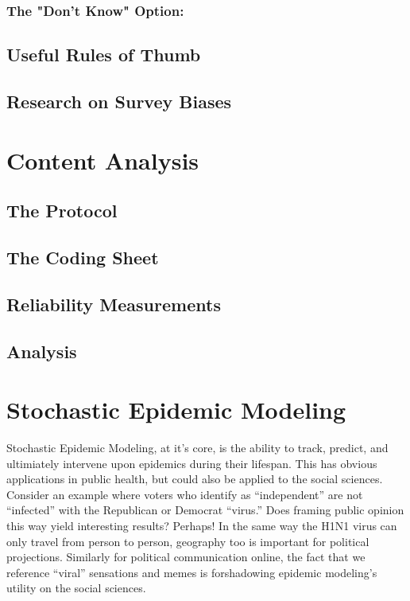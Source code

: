 \documentclass[12pt]{article}\usepackage[]{graphicx}\usepackage[]{color}
\begin{document}
\begin{flushleft}
\subsubsection{The "Don't Know" Option:}



\subsection{Useful Rules of Thumb}

\subsection{Research on Survey Biases}


\clearpage



\clearpage
\section{Content Analysis}

\subsection{The Protocol}

\subsection{The Coding Sheet}

\subsection{Reliability Measurements}

\subsection{Analysis}




\clearpage
\section{Stochastic Epidemic Modeling}

Stochastic Epidemic Modeling, at it's core, is the ability to track, predict, and ultimiately intervene upon epidemics during their lifespan. This has obvious applications in public health, but could also be applied to the social sciences. Consider an example where voters who identify as ``independent'' are not ``infected'' with the Republican or Democrat ``virus.'' Does framing public opinion this way yield interesting results? Perhaps! In the same way the H1N1 virus can only travel from person to person, geography too is important for political projections. Similarly for political communication online, the fact that we reference ``viral'' sensations and memes is forshadowing epidemic modeling's utility on the social sciences.


\end{flushleft}
\end{document}

